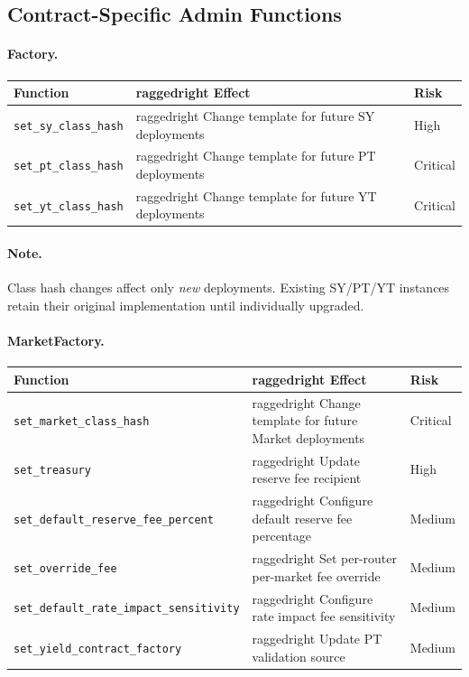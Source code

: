 \subsection{Contract-Specific Admin Functions}

\paragraph{Factory.}
\begin{center}
\begin{tabularx}{\textwidth}{l >{raggedright\arraybackslash}X l}
\toprule
\textbf{Function} & \textbf{Effect} & \textbf{Risk} \\
\midrule
\texttt{set\_sy\_class\_hash} & Change template for future SY deployments & High \\
\texttt{set\_pt\_class\_hash} & Change template for future PT deployments & Critical \\
\texttt{set\_yt\_class\_hash} & Change template for future YT deployments & Critical \\
\bottomrule
\end{tabularx}
\end{center}

\paragraph{Note.} Class hash changes affect only \emph{new} deployments. Existing SY/PT/YT instances retain their original implementation until individually upgraded.

\paragraph{MarketFactory.}
\begin{center}
\begin{tabularx}{\textwidth}{l >{raggedright\arraybackslash}X l}
\toprule
\textbf{Function} & \textbf{Effect} & \textbf{Risk} \\
\midrule
\texttt{set\_market\_class\_hash} & Change template for future Market deployments & Critical \\
\texttt{set\_treasury} & Update reserve fee recipient & High \\
\texttt{set\_default\_reserve\_fee\_percent} & Configure default reserve fee percentage & Medium \\
\texttt{set\_override\_fee} & Set per-router per-market fee override & Medium \\
\texttt{set\_default\_rate\_impact\_sensitivity} & Configure rate impact fee sensitivity & Medium \\
\texttt{set\_yield\_contract\_factory} & Update PT validation source & Medium \\
\bottomrule
\end{tabularx}
\end{center}

